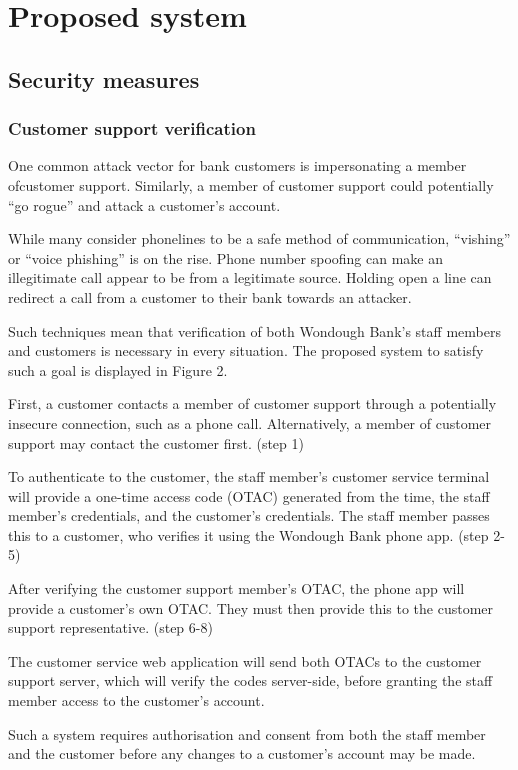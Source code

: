 \section{Proposed system}

\subsection{Security measures}
\subsubsection{Customer support verification}

One common attack vector for bank customers is impersonating a member ofcustomer
support. Similarly, a member of customer support could potentially ``go rogue'' 
and attack a customer’s account.

While many consider phonelines to be a safe method of communication, ``vishing''
or ``voice phishing'' is on the rise. \cite{bbcPhone} Phone number spoofing can make an
illegitimate call appear to be from a legitimate source. Holding open a line can
redirect a call from a customer to their bank towards an attacker.

Such techniques mean that verification of both Wondough Bank’s staff members and customers is necessary in every situation. The proposed system to satisfy such a goal is displayed in Figure 2.

First, a customer contacts a member of customer support through a potentially insecure connection, such as a phone call. Alternatively, a member of customer support may contact the customer first. (step 1)

To authenticate to the customer, the staff member’s customer service terminal will provide a one-time access code (OTAC) generated from the time, the staff member’s credentials, and the customer’s credentials. The staff member passes this to a customer, who verifies it using the Wondough Bank phone app. (step 2-5)

After verifying the customer support member’s OTAC, the phone app will provide a customer’s own OTAC. They must then provide this to the customer support representative. (step 6-8)

The customer service web application will send both OTACs to the customer support server, which will verify the codes server-side, before granting the staff member access to the customer’s account.

Such a system requires authorisation and consent from both the staff member and the customer before any changes to a customer’s account may be made.
